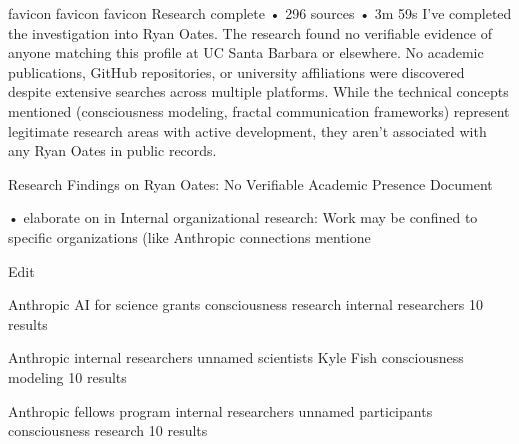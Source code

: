 {favicon
favicon
favicon
Research complete
•
296 sources
•
3m 59s
I've completed the investigation into Ryan Oates. The research found no verifiable evidence of anyone matching this profile at UC Santa Barbara or elsewhere. No academic publications, GitHub repositories, or university affiliations were discovered despite extensive searches across multiple platforms. While the technical concepts mentioned (consciousness modeling, fractal communication frameworks) represent legitimate research areas with active development, they aren't associated with any Ryan Oates in public records.


Research Findings on Ryan Oates: No Verifiable Academic Presence
Document



•    elaborate on in Internal organizational research: Work may be confined to specific organizations (like Anthropic connections mentione

Edit

Anthropic AI for science grants consciousness research internal researchers
10 results






















Anthropic internal researchers unnamed scientists Kyle Fish consciousness modeling
10 results






















Anthropic fellows program internal researchers unnamed participants consciousness research
10 results





















}
